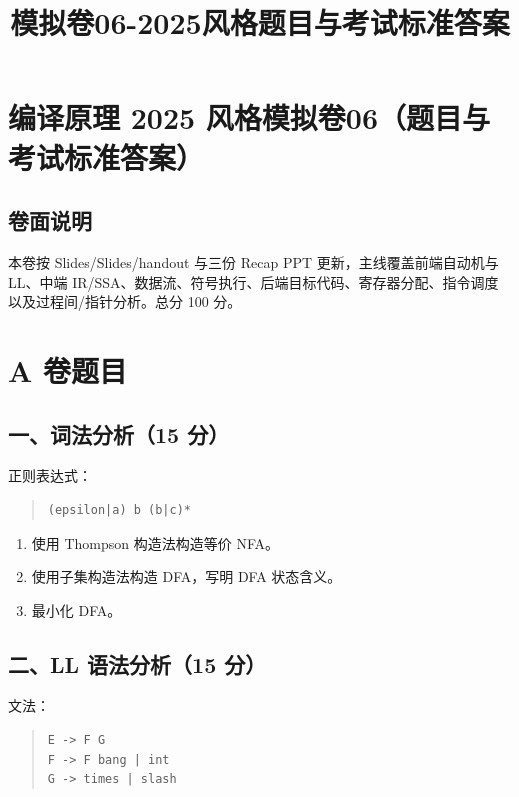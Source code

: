 \documentclass[UTF8,zihao=-4]{ctexart}
\title{模拟卷06-2025风格题目与考试标准答案}
\author{}
\date{}
\begin{document}
\maketitle
\setcounter{tocdepth}{1}
\tableofcontents
\newpage
\section{编译原理 2025 风格模拟卷06（题目与考试标准答案）}


\subsection{卷面说明}


本卷按 Slides/Slides/handout 与三份 Recap PPT 更新，主线覆盖前端自动机与 LL、中端 IR/SSA、数据流、符号执行、后端目标代码、寄存器分配、指令调度以及过程间/指针分析。总分 100 分。


\section{A 卷题目}


\subsection{一、词法分析（15 分）}


正则表达式：


\begin{quote}
\footnotesize
\begin{verbatim}
(epsilon|a) b (b|c)*
\end{verbatim}
\end{quote}


\begin{enumerate}
\item 使用 Thompson 构造法构造等价 NFA。
\item 使用子集构造法构造 DFA，写明 DFA 状态含义。
\item 最小化 DFA。
\end{enumerate}


\subsection{二、LL 语法分析（15 分）}


文法：


\begin{quote}
\footnotesize
\begin{verbatim}
E -> F G
F -> F bang | int
G -> times | slash
\end{verbatim}
\end{quote}
\end{document}
